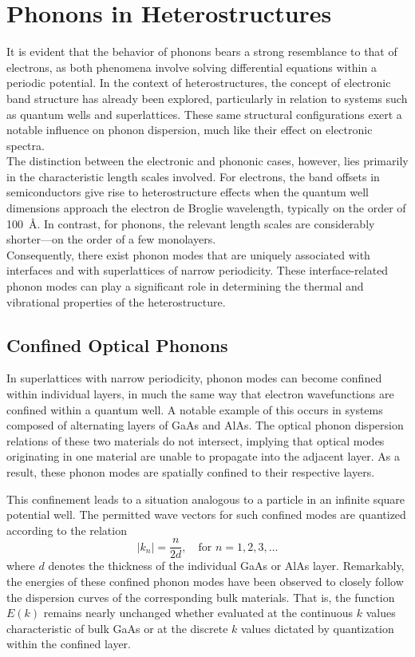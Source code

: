 \section{Phonons in Heterostructures}
It is evident that the behavior of phonons bears a strong resemblance to that of electrons, as both phenomena involve solving differential equations within a periodic potential. In the context of heterostructures, the concept of electronic band structure has already been explored, particularly in relation to systems such as quantum wells and superlattices. These same structural configurations exert a notable influence on phonon dispersion, much like their effect on electronic spectra.\\
The distinction between the electronic and phononic cases, however, lies primarily in the characteristic length scales involved. For electrons, the band offsets in semiconductors give rise to heterostructure effects when the quantum well dimensions approach the electron de Broglie wavelength, typically on the order of 100~\AA. In contrast, for phonons, the relevant length scales are considerably shorter—on the order of a few monolayers.\\
Consequently, there exist phonon modes that are uniquely associated with interfaces and with superlattices of narrow periodicity. These interface-related phonon modes can play a significant role in determining the thermal and vibrational properties of the heterostructure.
\subsection{Confined Optical Phonons}
In superlattices with narrow periodicity, phonon modes can become confined within individual layers, in much the same way that electron wavefunctions are confined within a quantum well. A notable example of this occurs in systems composed of alternating layers of GaAs and AlAs. The optical phonon dispersion relations of these two materials do not intersect, implying that optical modes originating in one material are unable to propagate into the adjacent layer. As a result, these phonon modes are spatially confined to their respective layers.

This confinement leads to a situation analogous to a particle in an infinite square potential well. The permitted wave vectors for such confined modes are quantized according to the relation
\begin{equation}
	|k_n| = \frac{n}{2d}, \quad \text{for } n = 1, 2, 3, \dots
\end{equation}
where $d$ denotes the thickness of the individual GaAs or AlAs layer. Remarkably, the energies of these confined phonon modes have been observed to closely follow the dispersion curves of the corresponding bulk materials. That is, the function $E(k)$ remains nearly unchanged whether evaluated at the continuous $k$ values characteristic of bulk GaAs or at the discrete $k$ values dictated by quantization within the confined layer.
